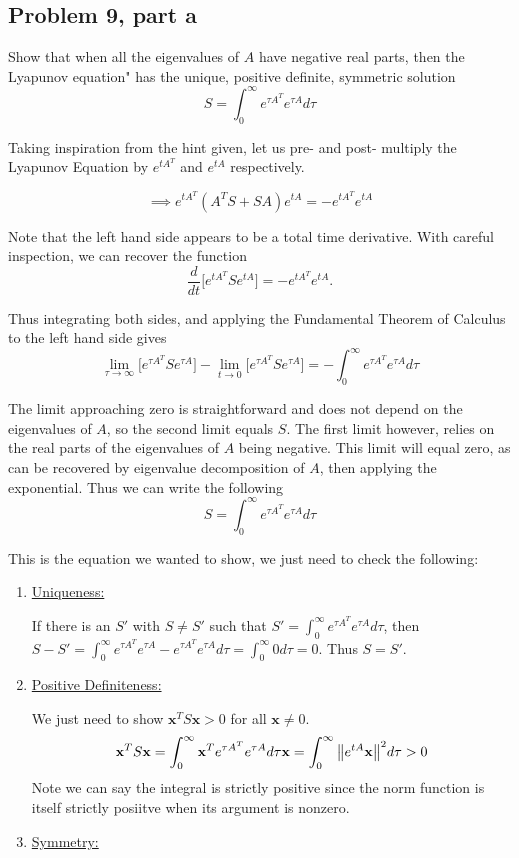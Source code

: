 \subsection{Problem 9, part a}
Show that when all the eigenvalues of $A$ have negative real parts, then the        Lyapunov equation" has the unique, positive definite, symmetric solution
\[
S = \int_0^\infty e^{\tau A^T}e^{\tau A}d\tau
\]
\partbreak
\begin{solution}

    Taking inspiration from the hint given, let us pre- and post- multiply the Lyapunov Equation by $e^{tA^T}$ and $e^{tA}$ respectively. 

    \[
    \implies e^{tA^T}(A^TS + SA)e^{tA} = -e^{tA^T}e^{tA}
    \]

    Note that the left hand side appears to be a total time derivative. With careful inspection, we can recover the function
    \[
    \frac{d}{dt}\Big[ e^{tA^T}Se^{tA} \Big] = -e^{tA^T}e^{tA}.
    \]

    Thus integrating both sides, and applying the Fundamental Theorem of Calculus to the left hand side gives
    \[
    \lim_{\tau \rightarrow \infty} \Big[ e^{\tau A^T}Se^{\tau A}\Big] - \lim_{t \rightarrow 0} \Big[ e^{\tau A^T}Se^{\tau A}\Big] = -\int_0^\infty e^{\tau A^T}e^{\tau A} d\tau
    \]

    The limit approaching zero is straightforward and does not depend on the eigenvalues of $A$, so the second limit equals $S$. The first limit however, relies on the real parts of the eigenvalues of $A$ being negative. This limit will equal zero, as can be recovered by eigenvalue decomposition of $A$, then applying the exponential. Thus we can write the following
    \[
    S = \int_0^\infty e^{\tau A^T}e^{\tau A} d\tau
    \]

    This is the equation we wanted to show, we just need to check the following:
    \begin{enumerate}
        \item \underline{Uniqueness:}

        If there is an $S'$ with $S \neq S'$ such that $S' = \int_0^\infty e^{\tau A^T}e^{\tau A} d\tau$, then $S - S' = \int_0^\infty e^{\tau A^T}e^{\tau A} - e^{\tau A^T}e^{\tau A} d\tau = \int_0^\infty 0 d\tau = 0$. Thus $S = S'$.
        \item \underline{Positive Definiteness:}

        We just need to show $\textbf{x}^TS\textbf{x} > 0$ for all $\textbf{x} \neq 0$.
        \[
        \textbf{x}^TS\textbf{x} = \int_0^\infty \textbf{x}^T e^{\tau A^T}e^{\tau A} d\tau\textbf{x} =  \int_0^\infty \norm{e^{tA}\textbf{x}}^2 d\tau > 0
        \]
        Note we can say the integral is strictly positive since the norm function is itself strictly posiitve when its argument is nonzero.
        \item \underline{Symmetry:}


\end{enumerate}
\end{solution}
